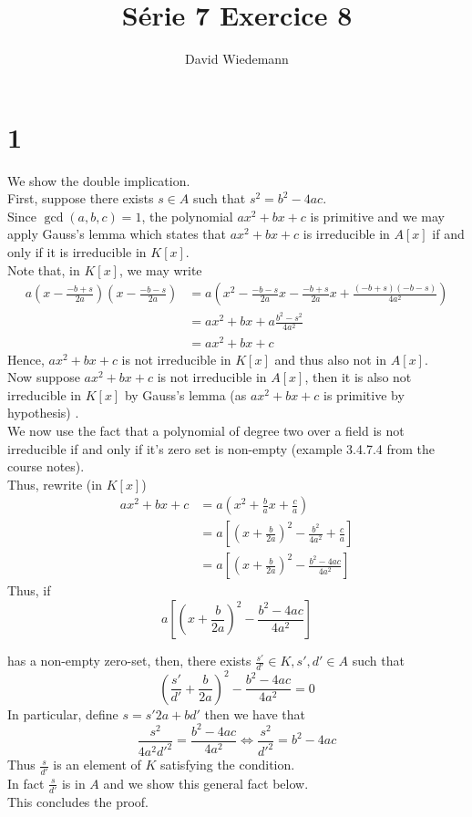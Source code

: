 \documentclass[11pt, a4paper]{article}
\begin{document}
\title{Série 7 Exercice 8}
\author{David Wiedemann}
\maketitle
\section*{1}
We show the double implication.\\
First, suppose there exists $s\in A$ such that $ s^{2}= b^{2}- 4ac$.\\
Since $\gcd( a,b,c) =1$, the polynomial $ax^{2}+bx + c$ is primitive and we may apply Gauss's lemma which states that $ax^{2}+bx+c$ is irreducible in $A[x]$  if and only if it is irreducible in $ K[x]$.\\
Note that, in $K[x]$, we may write
\begin{align*}
	a ( x- \frac{-b+s}{2a}) ( x- \frac{-b-s}{2a}) &=a\left(  x^{2} - \frac{-b-s}{2a}x - \frac{-b+s}{2a} x + \frac{( -b+s) ( -b-s) }{4a^{2}} \right)\\
&= ax^{2} + bx + a \frac{b^{2}-s^{2}}{4a^{2}} \\
&= ax^{2} + bx + c
\end{align*}
Hence, $ax^{2}+bx+c$ is not irreducible in $K[x]$ and thus also not in $A[x]$.\\

Now suppose $ ax^{2}+bx + c$ is not irreducible in $A[x] $, then it is also not irreducible in $ K[x]$ by Gauss's lemma (as $ ax^{2}+ bx +c$ is primitive by hypothesis) .\\
We now use the fact that a polynomial of degree two over a field is not irreducible if and only if it's zero set is non-empty (example 3.4.7.4 from the course notes).\\
Thus, rewrite (in $K[x]$) 
\begin{align*}
ax^{2} + bx + c &= a ( x^{2}+ \frac{b}{a}x + \frac{c}{a}) \\
&= a \left[ ( x+ \frac{b}{2a})^{2}  - \frac{b^{2}}{4a^{2}}+ \frac{c}{a} \right] \\
&= a \left[ ( x+ \frac{b}{2a}) ^{2} - \frac{b^{2}- 4ac}{4a^{2}} \right] 
\end{align*}
Thus, if 
\[ 
a \left[ ( x+ \frac{b}{2a}) ^{2} - \frac{b^{2}-4ac}{4a^{2}} \right] 
\]

has a non-empty zero-set, then, there exists $ \frac{s'}{d'}\in K, s',d' \in A$ such that
\[ 
 ( \frac{s'}{d'} + \frac{b}{2a}) ^{2} - \frac{b^{2}-4ac}{4a^{2}} = 0
\]
In particular, define $ s=  s'2a + bd' $ then we have that 
\[ 
\frac{s^{2}}{4a^{2}d'^{2}}= \frac{b^{2}-4ac}{4a^{2}}\iff \frac{s^{2}}{d'^{2}} = b^{2}-4ac
\]
Thus $ \frac{s}{d'}$ is an element of $K$  satisfying the condition.\\
In fact $ \frac{s}{d'} $ is in $A$ and we show this general fact below.\\
This concludes the proof.\\
\end{document}
